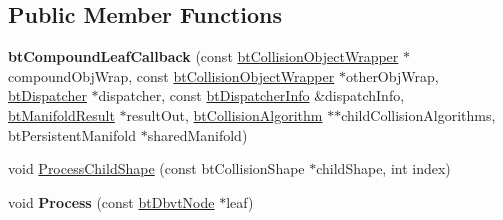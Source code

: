 \subsection*{Public Member Functions}
\begin{DoxyCompactItemize}
\item 
\mbox{\label{structbtCompoundLeafCallback_aa12b6d730ae8eb238fb42696c542e891}} 
{\bfseries bt\+Compound\+Leaf\+Callback} (const \hyperlink{structbtCollisionObjectWrapper}{bt\+Collision\+Object\+Wrapper} $\ast$compound\+Obj\+Wrap, const \hyperlink{structbtCollisionObjectWrapper}{bt\+Collision\+Object\+Wrapper} $\ast$other\+Obj\+Wrap, \hyperlink{classbtDispatcher}{bt\+Dispatcher} $\ast$dispatcher, const \hyperlink{structbtDispatcherInfo}{bt\+Dispatcher\+Info} \&dispatch\+Info, \hyperlink{classbtManifoldResult}{bt\+Manifold\+Result} $\ast$result\+Out, \hyperlink{classbtCollisionAlgorithm}{bt\+Collision\+Algorithm} $\ast$$\ast$child\+Collision\+Algorithms, bt\+Persistent\+Manifold $\ast$shared\+Manifold)
\item 
void \hyperlink{structbtCompoundLeafCallback_a447295638bb470ddfbcdd314eb14b6ad}{Process\+Child\+Shape} (const bt\+Collision\+Shape $\ast$child\+Shape, int index)
\item 
\mbox{\label{structbtCompoundLeafCallback_aec8c0611c31835fac977d230701a71d5}} 
void {\bfseries Process} (const \hyperlink{structbtDbvtNode}{bt\+Dbvt\+Node} $\ast$leaf)
\end{DoxyCompactItemize}
